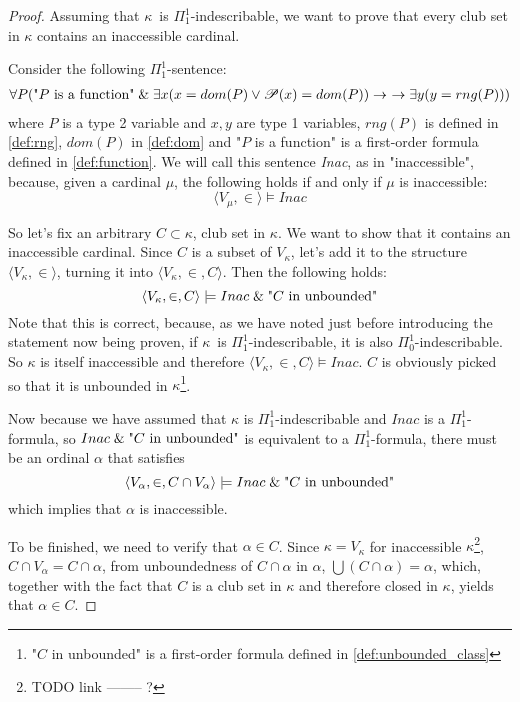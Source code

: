 \begin{proof}
Assuming that $\kappa$ is $\Pi^1_1$-indescribable, we want to prove that every club set in $\kappa$ contains an inaccessible cardinal. 

Consider the following $\Pi^1_1$-sentence:
\begin{equation}
\begin{gathered}\label{eq:inac}
\forall P (\mbox{"$P$ is a function"} \mathrel{\&} \exists x(x = dom(P) \lor \mathscr{P} (x) = dom(P)) \rightarrow\
\rightarrow \exists y(y = rng(P)))
\end{gathered}
\end{equation}
where $P$ is a type 2 variable and $x, y$ are type 1 variables, $rng(P)$ is defined in \ref{def:rng}, $dom(P)$ in \ref{def:dom} and "$P$ is a function" is a first-order formula defined in \ref{def:function}.
We will call this sentence \emph{Inac}, as in "inaccessible", because, given a cardinal $\mu$, the following holds if and only if $\mu$ is inaccessible:
\begin{equation}
\langle V_\mu, \in \rangle \models Inac
\end{equation}

So let's fix an arbitrary $C \subset \kappa$, club set in $\kappa$. We want to show that it contains an inaccessible cardinal. Since $C$ is a subset of $V_\kappa$, let's add it to the structure $\langle V_\kappa, \in \rangle$, turning it into $\langle V_\kappa, \in, C \rangle$. Then the following holds:
\begin{equation}
\langle V_\kappa, \in, C \rangle \models Inac \mathrel{\&} \mbox{"$C$ in unbounded"}
\end{equation}
Note that this is correct, because, as we have noted just before introducing the statement now being proven, if $\kappa$ is $\Pi^1_1$-indescribable, it is also $\Pi^1_0$-indescribable. So $\kappa$ is itself inaccessible and therefore $\langle V_\kappa, \in, C \rangle \models Inac$. $C$ is obviously picked so that it is unbounded in $\kappa$\footnote{"$C$ in unbounded" is a first-order formula defined in \ref{def:unbounded_class}}.

Now because we have assumed that $\kappa$ is $\Pi^1_1$-indescribable and $Inac$ is a $\Pi^1_1$-formula, so $Inac \mathrel{\&} \mbox{"$C$ in unbounded"}$ is equivalent to a $\Pi^1_1$-formula, there must be an ordinal $\alpha$ that satisfies
\begin{equation}
\langle V_\alpha, \in, C \cap V_\alpha \rangle \models Inac \mathrel{\&} \mbox{"$C$ in unbounded"}
\end{equation}
which implies that $\alpha$ is inaccessible. 

To be finished, we need to verify that $\alpha \in C$. Since $\kappa = V_\kappa$ for inaccessible $\kappa$\footnote{TODO link -------- ?}, $C \cap V_\alpha = C \cap \alpha$, from unboundedness of $C \cap \alpha$ in $\alpha$, $\bigcup(C \cap \alpha) = \alpha$, which, together with the fact that $C$ is a club set in $\kappa$ and therefore closed in $\kappa$, yields that $\alpha \in C$.
\end{proof}

